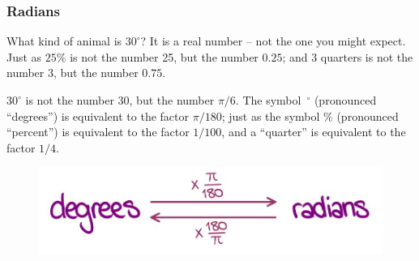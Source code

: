 \documentclass[xcolor=dvipsnames]{beamer}
\begin{document}
\begin{frame}
  \frametitle{Radians}
  What kind of animal is $30^{\circ}$? It is a real number -- not the
  one you might expect. Just as $25\%$ is not the number 25, but the
  number $0.25$; and 3 quarters is not the number 3, but the number
  $0.75$.

  $30^{\circ}$ is not the number 30, but the number $\pi/6$. The
  \mbox{symbol $^{\circ}$} (pronounced ``degrees'') is equivalent to
  the factor $\pi/180$; just as the symbol $\%$ (pronounced
  ``percent'') is equivalent to the factor $1/100$, and a ``quarter'' is
  equivalent to the factor $1/4$.
  \begin{figure}[h]
    \includegraphics[scale=.5]{./degreeradians.jpg}
  \end{figure}
\end{frame}


\end{document}
